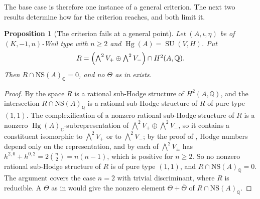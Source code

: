 \documentclass[11pt,reqno]{amsart}
\theoremstyle{plain}
\newtheorem{proposition}[theorem]{Proposition}
\theoremstyle{definition}
\theoremstyle{remark}
\newcommand{\QQ}{\mathbb{Q}}
\newcommand{\CC}{\mathbb{C}}
\newcommand{\NS}{\mathrm{NS}}
\DeclareMathOperator{\Hg}{Hg}
\DeclareMathOperator{\SU}{SU}
\newcommand{\bbar}[1]{\overline{#1}}
\begin{document}
The base case is therefore one instance of a general criterion. The next two
results determine how far the criterion reaches, and both limit it.

\begin{proposition}[The criterion fails at a general point]\label{prop:divfails}
Let $(A,\iota,\eta)$ be of $(K,-1,n)$-Weil type with $n\ge2$ and
$\Hg(A)=\SU(V,H)$. Put
\[
  R=\Bigl(\textstyle\bigwedge^{2}V_{+}\oplus\bigwedge^{2}V_{-}\Bigr)
      \cap H^{2}(A,\QQ).
\]
Then $R\cap\NS(A)_{\QQ}=0$, and no $\Theta$ as in 
exists.
\end{proposition}

\begin{proof}
By  the space $R$ is a rational sub-Hodge structure of
$H^{2}(A,\QQ)$, and the intersection $R\cap\NS(A)_{\QQ}$ is a rational
sub-Hodge structure of $R$ of pure type $(1,1)$. The complexification of a
nonzero rational sub-Hodge structure of $R$ is a nonzero
$\Hg(A)_{\CC}$-subrepresentation of $\bigwedge^{2}V_{+}\oplus\bigwedge^{2}V_{-}$,
so it contains a constituent isomorphic to $\bigwedge^{2}V_{+}$ or to
$\bigwedge^{2}V_{-}$; by the proof of , Hodge numbers
depend only on the representation, and by  each of
$\bigwedge^{2}V_{\pm}$ has $h^{2,0}+h^{0,2}=2\binom{n}{2}=n(n-1)$, which is
positive for $n\ge2$. So no nonzero rational sub-Hodge structure of $R$ is of
pure type $(1,1)$, and $R\cap\NS(A)_{\QQ}=0$. The argument covers the case
$n=2$ with trivial discriminant, where $R$ is reducible. A $\Theta$ as in
 would give the nonzero element $\Theta+\bbar{\Theta}$
of $R\cap\NS(A)_{\QQ}$.
\end{proof}
\end{document}
